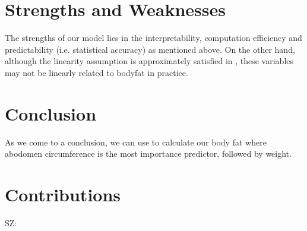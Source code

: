 \documentclass[12pt, letterpaper]{article}
\begin{document}
\section{Strengths and Weaknesses}
The strengths of our model lies in the interpretability, computation efficiency and predictability (i.e. statistical accuracy) as mentioned above. On the other hand, although the linearity assumption is approximately satisfied in , these variables may not be linearly related to bodyfat in practice. 

\section{Conclusion}
As we come to a conclusion, we can use  to calculate our body fat where abodomen circumference is the most importance predictor, followed by weight. 

\section{Contributions}
SZ: 
\pagebreak

{\small


}
\end{document}
